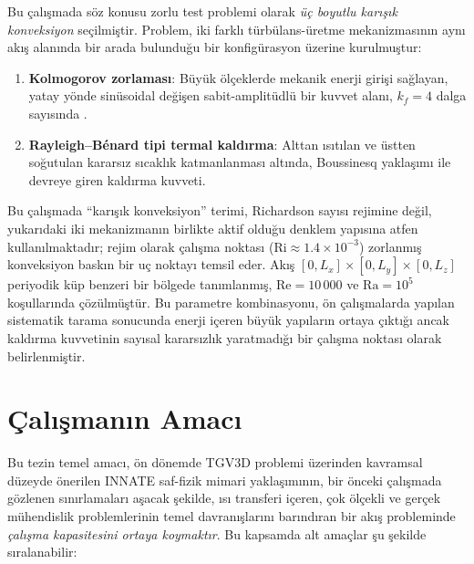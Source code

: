 Bu çalışmada söz konusu zorlu test problemi olarak \emph{üç boyutlu karışık konveksiyon} seçilmiştir. Problem, iki farklı türbülans-üretme mekanizmasının aynı akış alanında bir arada bulunduğu bir konfigürasyon üzerine kurulmuştur:
\begin{enumerate}
  \item \textbf{Kolmogorov zorlaması}: Büyük ölçeklerde mekanik enerji girişi sağlayan, yatay yönde sinüsoidal değişen sabit-amplitüdlü bir kuvvet alanı, $k_{f}=4$ dalga sayısında \cite{kolmogorov_1941}.
  \item \textbf{Rayleigh--B\'enard tipi termal kaldırma}: Alttan ısıtılan ve üstten soğutulan kararsız sıcaklık katmanlanması altında, Boussinesq yaklaşımı ile devreye giren kaldırma kuvveti.
\end{enumerate}
Bu çalışmada ``karışık konveksiyon'' terimi, Richardson sayısı rejimine değil, yukarıdaki iki mekanizmanın birlikte aktif olduğu denklem yapısına atfen kullanılmaktadır; rejim olarak çalışma noktası ($\mathrm{Ri}\approx 1.4\times 10^{-3}$) zorlanmış konveksiyon baskın bir uç noktayı temsil eder. Akış $[0,L_{x}]\times[0,L_{y}]\times[0,L_{z}]$ periyodik küp benzeri bir bölgede tanımlanmış, $\mathrm{Re}=10\,000$ ve $\mathrm{Ra}=10^{5}$ koşullarında çözülmüştür. Bu parametre kombinasyonu, ön çalışmalarda yapılan sistematik tarama sonucunda enerji içeren büyük yapıların ortaya çıktığı ancak kaldırma kuvvetinin sayısal kararsızlık yaratmadığı bir çalışma noktası olarak belirlenmiştir.

\section{Çalışmanın Amacı}

Bu tezin temel amacı, ön dönemde TGV3D problemi üzerinden kavramsal düzeyde önerilen INNATE saf-fizik mimari yaklaşımının, bir önceki çalışmada gözlenen sınırlamaları aşacak şekilde, ısı transferi içeren, çok ölçekli ve gerçek mühendislik problemlerinin temel davranışlarını barındıran bir akış probleminde \emph{çalışma kapasitesini ortaya koymaktır}. Bu kapsamda alt amaçlar şu şekilde sıralanabilir:

